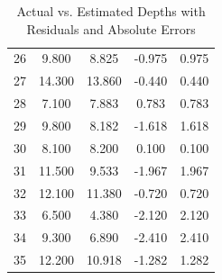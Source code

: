 \begin{table}[h!]
{\begin{tabular}{|c|c|c|c|c|}
			26 & 9.800 & 8.825 & -0.975 & 0.975 \\
			27 & 14.300 & 13.860 & -0.440 & 0.440 \\
			28 & 7.100 & 7.883 & 0.783 & 0.783 \\
			29 & 9.800 & 8.182 & -1.618 & 1.618 \\
			30 & 8.100 & 8.200 & 0.100 & 0.100 \\
			31 & 11.500 & 9.533 & -1.967 & 1.967 \\
			32 & 12.100 & 11.380 & -0.720 & 0.720 \\
			33 & 6.500 & 4.380 & -2.120 & 2.120 \\
			34 & 9.300 & 6.890 & -2.410 & 2.410 \\
			35 & 12.200 & 10.918 & -1.282 & 1.282 \\
			
			\hline
		\end{tabular}
	}
	\caption{Actual vs. Estimated Depths with Residuals and Absolute Errors}
	\label{tab:depth_results}
\end{table}

